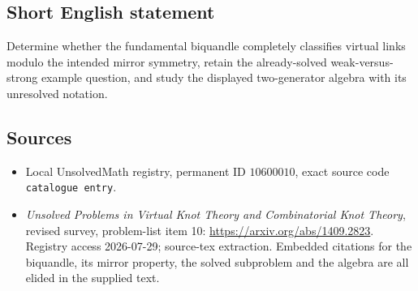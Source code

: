 \documentclass[11pt]{article}
\begin{document}
\subsection{Short English statement}
Determine whether the fundamental biquandle completely classifies virtual links modulo the intended mirror symmetry, retain the already-solved weak-versus-strong example question, and study the displayed two-generator algebra with its unresolved notation.
\subsection{Sources}
\begin{itemize}
\item Local UnsolvedMath registry, permanent ID \(10600010\), exact source code \texttt{catalogue entry}.
\item \emph{Unsolved Problems in Virtual Knot Theory and Combinatorial Knot Theory}, revised survey, problem-list item 10: \url{https://arxiv.org/abs/1409.2823}. Registry access 2026-07-29; source-tex extraction. Embedded citations for the biquandle, its mirror property, the solved subproblem and the algebra are all elided in the supplied text.
\end{itemize}
\end{document}

